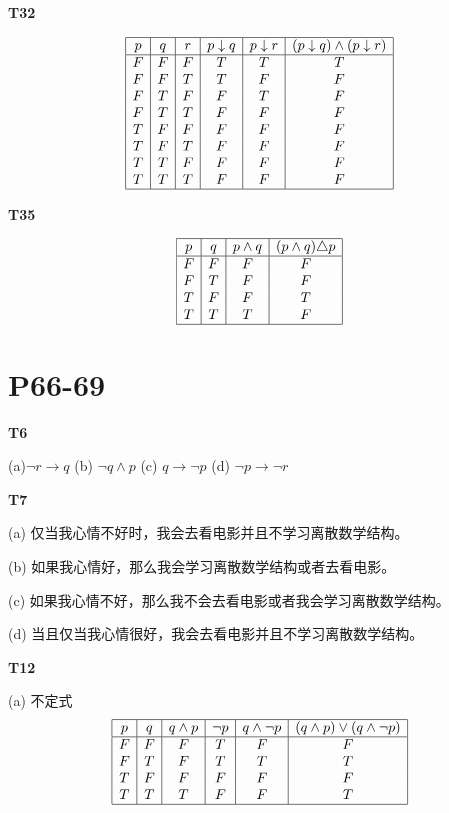 \documentclass[12pt, a4paper]{ctexart}
\begin{document}
\textbf{T32}

\[
\begin{array}{|c|c|c|c|c|c|}
    \hline
    p & q & r & p \downarrow q & p \downarrow r & (p \downarrow q) \land (p \downarrow r)\\
    \hline
    F & F & F & T & T & T\\
    F & F & T & T & F & F\\
    F & T & F & F & T & F\\
    F & T & T & F & F & F\\
    T & F & F & F & F & F\\
    T & F & T & F & F & F\\
    T & T & F & F & F & F\\
    T & T & T & F & F & F\\
    \hline
\end{array}
\]

\textbf{T35}

\[
\begin{array}{|c|c|c|c|}
    \hline
    p & q & p \land q & (p \land q) \triangle p\\
    \hline
    F & F & F & F\\
    F & T & F & F\\
    T & F & F & T\\
    T & T & T & F\\
    \hline
\end{array}
\]

\section{\textbf{P66-69}}

\textbf{T6}

(a)$\lnot r \rightarrow q$ \quad (b) $\lnot q \land p$ \quad (c) $q \rightarrow \lnot p$ \quad (d) $\lnot p \rightarrow \lnot r$

\textbf{T7}

(a) 仅当我心情不好时，我会去看电影并且不学习离散数学结构。

(b) 如果我心情好，那么我会学习离散数学结构或者去看电影。

(c) 如果我心情不好，那么我不会去看电影或者我会学习离散数学结构。

(d) 当且仅当我心情很好，我会去看电影并且不学习离散数学结构。

\textbf{T12}

(a) 不定式
\[
\begin{array}{|c|c|c|c|c|c|}
    \hline
    p & q & q \land p & \lnot p & q \land \lnot p & (q \land p) \lor (q \land \lnot p)\\
    \hline
    F & F & F & T & F & F\\
    F & T & F & T & T & T\\
    T & F & F & F & F & F\\
    T & T & T & F & F & T\\
    \hline
\end{array}
\]
\end{document}

